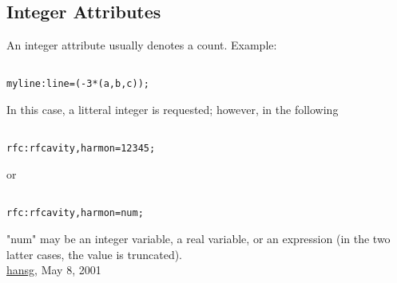 




\subsection{Integer Attributes}
An integer attribute usually denotes a count. Example: 
\begin{verbatim}

myline:line=(-3*(a,b,c));
\end{verbatim} In this case, a litteral integer is requested; however, in the following 
\begin{verbatim}

rfc:rfcavity,harmon=12345;
\end{verbatim} or 
\begin{verbatim}

rfc:rfcavity,harmon=num;
\end{verbatim} "num" may be an integer variable, a real variable, or an expression  (in the two latter cases, the value is truncated).
\\
\href{http://www.cern.ch/Hans.Grote/hansg_sign.html}{hansg}, May 8, 2001 

